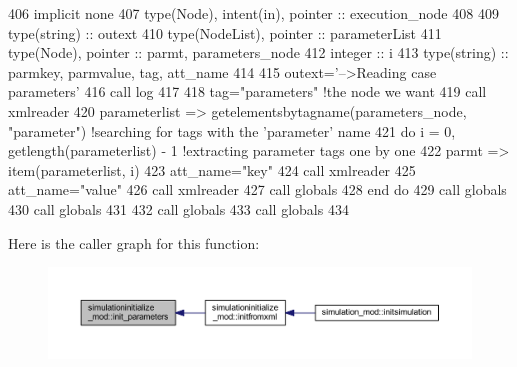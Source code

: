 \begin{DoxyCode}
406     \textcolor{keywordtype}{implicit none}
407     \textcolor{keywordtype}{type}(Node), \textcolor{keywordtype}{intent(in)}, \textcolor{keywordtype}{pointer} :: execution\_node
408 
409     \textcolor{keywordtype}{type}(string) :: outext
410     \textcolor{keywordtype}{type}(NodeList), \textcolor{keywordtype}{pointer} :: parameterList
411     \textcolor{keywordtype}{type}(Node), \textcolor{keywordtype}{pointer} :: parmt, parameters\_node
412     \textcolor{keywordtype}{integer} :: i
413     \textcolor{keywordtype}{type}(string) :: parmkey, parmvalue, tag, att\_name
414 
415     outext=\textcolor{stringliteral}{'-->Reading case parameters'}
416     \textcolor{keyword}{call }log%
417 
418     tag=\textcolor{stringliteral}{"parameters"}    \textcolor{comment}{!the node we want}
419     \textcolor{keyword}{call }xmlreader%
420     parameterlist => getelementsbytagname(parameters\_node, \textcolor{stringliteral}{"parameter"})       \textcolor{comment}{!searching for tags with the
       'parameter' name}
421     \textcolor{keywordflow}{do} i = 0, getlength(parameterlist) - 1                          \textcolor{comment}{!extracting parameter tags one by one}
422         parmt => item(parameterlist, i)
423         att\_name=\textcolor{stringliteral}{"key"}
424         \textcolor{keyword}{call }xmlreader%
425         att\_name=\textcolor{stringliteral}{"value"}
426         \textcolor{keyword}{call }xmlreader%
427         \textcolor{keyword}{call }globals%
428 \textcolor{keywordflow}{    end do}
429     \textcolor{keyword}{call }globals%
430     \textcolor{keyword}{call }globals%
431     
432     \textcolor{keyword}{call }globals%
433     \textcolor{keyword}{call }globals%
434 
\end{DoxyCode}
Here is the caller graph for this function\+:\nopagebreak
\begin{figure}[H]
\begin{center}
\leavevmode
\includegraphics[width=350pt]{namespacesimulationinitialize__mod_a0b32e8c950fc615198d1e47ba1d36cd6_icgraph}
\end{center}
\end{figure}
\mbox{\label{namespacesimulationinitialize__mod_a532cb4960e93dc27cff5dc2e04afe070}} 
